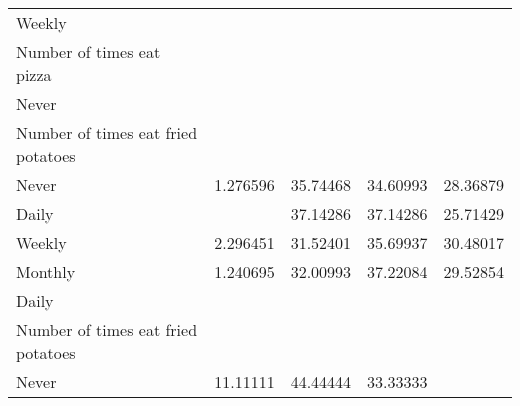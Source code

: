 \documentclass{article}
\begin{document}
\begin{tabular}{lllll}
\multicolumn{1}{l}{\hspace{1em}Weekly} &
  \multicolumn{1}{|r}{} &
  \multicolumn{1}{r}{} &
  \multicolumn{1}{r}{} &
  \multicolumn{1}{r}{} \\
\multicolumn{1}{l}{\hspace{2em}Number of times eat pizza} &
  \multicolumn{1}{|r}{} &
  \multicolumn{1}{r}{} &
  \multicolumn{1}{r}{} &
  \multicolumn{1}{r}{} \\
\multicolumn{1}{l}{\hspace{3em}Never} &
  \multicolumn{1}{|r}{} &
  \multicolumn{1}{r}{} &
  \multicolumn{1}{r}{} &
  \multicolumn{1}{r}{} \\
\multicolumn{1}{l}{\hspace{4em}Number of times eat fried potatoes} &
  \multicolumn{1}{|r}{} &
  \multicolumn{1}{r}{} &
  \multicolumn{1}{r}{} &
  \multicolumn{1}{r}{} \\
\multicolumn{1}{l}{\hspace{5em}Never} &
  \multicolumn{1}{|r}{1.276596} &
  \multicolumn{1}{r}{35.74468} &
  \multicolumn{1}{r}{34.60993} &
  \multicolumn{1}{r}{28.36879} \\
\multicolumn{1}{l}{\hspace{5em}Daily} &
  \multicolumn{1}{|r}{} &
  \multicolumn{1}{r}{37.14286} &
  \multicolumn{1}{r}{37.14286} &
  \multicolumn{1}{r}{25.71429} \\
\multicolumn{1}{l}{\hspace{5em}Weekly} &
  \multicolumn{1}{|r}{2.296451} &
  \multicolumn{1}{r}{31.52401} &
  \multicolumn{1}{r}{35.69937} &
  \multicolumn{1}{r}{30.48017} \\
\multicolumn{1}{l}{\hspace{5em}Monthly} &
  \multicolumn{1}{|r}{1.240695} &
  \multicolumn{1}{r}{32.00993} &
  \multicolumn{1}{r}{37.22084} &
  \multicolumn{1}{r}{29.52854} \\
\multicolumn{1}{l}{\hspace{3em}Daily} &
  \multicolumn{1}{|r}{} &
  \multicolumn{1}{r}{} &
  \multicolumn{1}{r}{} &
  \multicolumn{1}{r}{} \\
\multicolumn{1}{l}{\hspace{4em}Number of times eat fried potatoes} &
  \multicolumn{1}{|r}{} &
  \multicolumn{1}{r}{} &
  \multicolumn{1}{r}{} &
  \multicolumn{1}{r}{} \\
\multicolumn{1}{l}{\hspace{5em}Never} &
  \multicolumn{1}{|r}{11.11111} &
  \multicolumn{1}{r}{44.44444} &
  \multicolumn{1}{r}{33.33333} &

\end{tabular}
\end{document}
